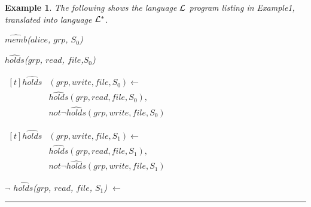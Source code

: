\documentclass[10pt, twocolumn]{article}
\newtheorem{examp}{Example}
\newenvironment{example}{\begin{examp}\rm}{\rule{2mm}{2mm}\end{examp}}
\begin{document}
        \begin{example}
          The following shows the language ${\cal L}$ program listing in
          Example1,  translated into language ${\cal L}^{*}$.

          \begin{list}{}{Initial State Facts}
            \item
              $\hat{memb}$($alice$, $grp$, $S_{0}$)
            \item
              $\hat{holds}$($grp$, $read$, $file$,$S_{0}$)
          \end{list}

          \begin{list}{}{Constraints}
            \item
              \begin{math}
                  \begin{aligned}[t]
                    \hat{holds}&(grp, write, file, S_{0}) \leftarrow \\
                    & \hat{holds}(grp, read, file, S_{0}), \\
                    & not \lnot \hat{holds}(grp, write, file, S_{0})
                  \end{aligned}
              \end{math}
            \item
              \begin{math}
                  \begin{aligned}[t]
                    \hat{holds}&(grp, write, file, S_{1}) \leftarrow \\
                    & \hat{holds}(grp, read, file, S_{1}), \\
                    & not \lnot \hat{holds}(grp, write, file, S_{1})
                  \end{aligned}
              \end{math}
          \end{list}

          \begin{list}{}{Policy Update}
            \item
              $\lnot$ $\hat{holds}$($grp$, $read$, $file$, $S_{1}$) $\leftarrow$
          \end{list}


\end{example}
\end{document}
